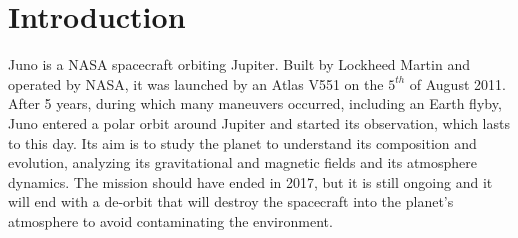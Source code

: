 \section{Introduction}
\label{sec:introduction}

Juno is a NASA spacecraft orbiting Jupiter. Built by Lockheed Martin and operated by NASA, it was launched by an Atlas V551 on the $5^{th}$ of August 2011. After 5 years, during which many maneuvers occurred, including an Earth flyby, Juno entered a polar orbit around Jupiter and started its observation, which lasts to this day. Its aim is to study the planet to understand its composition and evolution, analyzing its gravitational and magnetic fields and its atmosphere dynamics. The mission should have ended in 2017, but it is still ongoing\cite{fact_sheet} and it will end with a de-orbit that will destroy the spacecraft into the planet's atmosphere to avoid contaminating the environment.